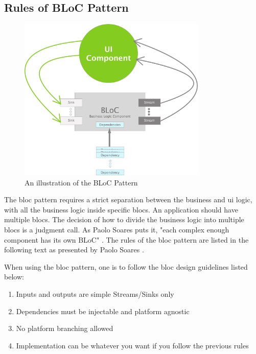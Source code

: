 \subsection{Rules of BLoC Pattern}
\begin{figure}[h]
    \centering
    \includegraphics[width=0.8\textwidth]{figures/bloc_pattern.pdf}
    \caption{An illustration of the BLoC Pattern}
    \label{fig:blocPattern}
\end{figure}

The \Gls{bloc} pattern requires a strict separation between the business and \gls{ui} logic, with all the business logic inside specific \glspl{bloc}. An application should have multiple \glspl{bloc}. The decision of how to divide the business logic into multiple \glspl{bloc} is a judgment call. As Paolo Soares puts it, "each complex enough component has its own BLoC" \cite[24 min 15 sec]{blocPattern}. The rules of the \gls{bloc} pattern are listed in the following text as presented by Paolo Soares \cite[22 min 25 sec]{blocPattern}.

When using the \gls{bloc} pattern, one is to follow the \gls{bloc} design guidelines listed below:

\begin{enumerate}
  \item Inputs and outputs are simple Streams/Sinks only
  \item Dependencies must be injectable and platform agnostic
  \item No platform branching allowed
  \item Implementation can be whatever you want if you follow the previous rules
\end{enumerate}

